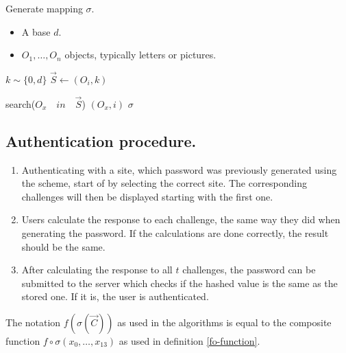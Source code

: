 \begin{algorithm}
    \caption{Generate mapping $\sigma$.}
    \begin{algorithmic}[1]
        \Require
            \Statex \begin{itemize}
                \item A base $d$.
                \item $O_1,\dots,O_n$ objects, typically letters or pictures.
            \end{itemize}
        
            \State $k \sim \{0,d\}$
            \State $\vec S \leftarrow (O_i,k)$
        \EndFor
        \Statex

            \State search($O_x\quad in\quad \vec S$)
            \State \Return $(O_x, i)$
        \EndFunction
        \Statex
        \State \Return $\sigma$
    \end{algorithmic}
    \label{gen-mapping}
\end{algorithm}
\subsection{Authentication procedure.}\label{subsec:auth}
\begin{enumerate}
    \item Authenticating with a site, which password was previously generated using the scheme, start of by selecting the correct site. The corresponding challenges will then be displayed starting with the first one.
    \item Users calculate the response to each challenge, the same way they did when generating the password. If the calculations are done correctly, the result should be the same.
    \item After calculating the response to all $t$ challenges, the password can be submitted to the server which checks if the hashed value is the same as the stored one. If it is, the user is authenticated.
\end{enumerate}

\begin{remark}
    The notation $f(\sigma(\vec C))$ as used in the algorithms is equal to the composite function $f \circ \sigma(x_0,\dots,x_{13})$ as used in definition \ref{fo-function}.

\end{remark}

